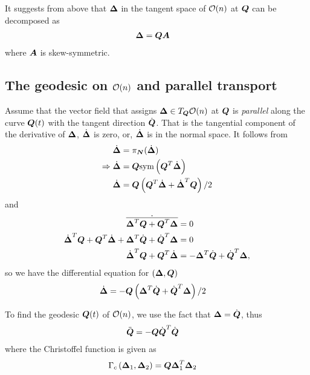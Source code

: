 \documentclass[11pt]{article}
\begin{document}
It suggests from above that $\boldsymbol{\Delta}$ in the tangent space of ${\mathcal O}(n)$ at $\boldsymbol{Q}$ can be decomposed as 
\begin{align}
\mb{\Delta} &= \mb{Q}\mb{A}  \label{eqn: tangent_form} %
\end{align}
where $\boldsymbol{A}$ is skew-symmetric. %

\subsection{The geodesic on ${\mathcal O}(n)$ and parallel transport }
Assume that the vector field that assigns $\boldsymbol{\Delta} \in T_{\boldsymbol{Q}}{\mathcal O}(n)$ at $\boldsymbol{Q}$ is \emph{parallel} along the curve $\boldsymbol{Q}(t)$ with the tangent direction $\dot{\boldsymbol{Q}}$. That is the tangential component of the derivative of $\boldsymbol{\Delta}$, $\dot{\boldsymbol{\Delta}}$ is zero, or, $\dot{\boldsymbol{\Delta}}$ is in the normal space. It follows from  
\begin{align*}
\dot{\boldsymbol{\Delta}} &=\pi_{\boldsymbol{N}}(\dot{\boldsymbol{\Delta}}) \\
\Rightarrow  \dot{\boldsymbol{\Delta}}  &= \boldsymbol{Q}\text{sym}\left(\boldsymbol{Q}^{T}\dot{\boldsymbol{\Delta}} \right)\\
\dot{\boldsymbol{\Delta}} &= \boldsymbol{Q}\left( \boldsymbol{Q}^{T}\dot{\boldsymbol{\Delta}} + \dot{\boldsymbol{\Delta}}^{T}\boldsymbol{Q} \right)/2
\end{align*} 
and
\begin{align*}
\dot{\overline{\boldsymbol{\Delta}^{T}\boldsymbol{Q} + \boldsymbol{Q}^{T}\boldsymbol{\Delta}}} &= 0\\
\dot{\boldsymbol{\Delta}}^{T}\boldsymbol{Q} + \boldsymbol{Q}^{T}\dot{\boldsymbol{\Delta}}+ \boldsymbol{\Delta}^{T}\dot{\boldsymbol{Q}}+  \dot{\boldsymbol{Q}}^{T}\boldsymbol{\Delta}
&= 0\\
\dot{\boldsymbol{\Delta}}^{T}\boldsymbol{Q} + \boldsymbol{Q}^{T}\dot{\boldsymbol{\Delta}}&= -  \boldsymbol{\Delta}^{T}\dot{\boldsymbol{Q}}+  \dot{\boldsymbol{Q}}^{T}\boldsymbol{\Delta},
\end{align*}
so we have the differential equation for $(\boldsymbol{\Delta}, \boldsymbol{Q})$
\begin{align}
\dot{\boldsymbol{\Delta}} &= -\boldsymbol{Q}\left( \boldsymbol{\Delta}^{T}\dot{\boldsymbol{Q}}+  \dot{\boldsymbol{Q}}^{T}\boldsymbol{\Delta} \right)/2 \label{eqn: cov_deriv_eqn}
\end{align}

To find the geodesic $\boldsymbol{Q}(t)$ of ${\mathcal O}(n)$, we use the fact that $\boldsymbol{\Delta} = \dot{\boldsymbol{Q}}$, thus
\begin{align}
\ddot{\boldsymbol{Q}} &= -\boldsymbol{Q} \dot{\boldsymbol{Q}}^{T}\dot{\boldsymbol{Q}} \label{eqn: diff_geodesic_eqn_general}
\end{align}
where the Christoffel function is given as 
\begin{align}
\Gamma_{c}\left(\boldsymbol{\Delta}_{1}, \boldsymbol{\Delta}_{2}\right) &= \boldsymbol{Q} \boldsymbol{\Delta}_{1}^{T}\boldsymbol{\Delta}_{2} \label{eqn: Christoffel_ortho}
\end{align}
\end{document}
